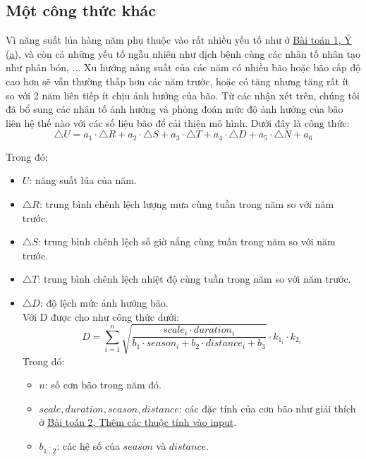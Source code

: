 \documentclass[12pt]{report}
\begin{document}
\subsection{Một công thức khác}
\begin{flushleft}
	Vì năng suất lúa hàng năm phụ thuộc vào rất nhiều yếu tố như ở \textcolor{blue}{\hyperlink{section.1.1}{Bài toán 1, Ý (a)}}, và còn cả những yếu tố ngẫu nhiên như dịch bệnh cùng các nhân tố nhân tạo như phân bón, ... Xu hướng năng suất của các năm có nhiều bão hoặc bão cấp độ cao hơn sẽ vẫn thường thấp hơn các năm trước, hoặc có tăng nhưng tăng rất ít so với 2 năm liên tiếp ít chịu ảnh hưởng của bão. Từ các nhận xét trên, chúng tôi đã bổ sung các nhân tố ảnh hưởng và phỏng đoán mức độ ảnh hưởng của bão liên hệ thế nào với các số liệu bão để cải thiện mô hình. Dưới đây là công thức:
	$$
		\triangle{U} = a_{1} \cdot \triangle{R} + a_{2} \cdot \triangle{S} + a_{3} \cdot \triangle{T} + a_{4} \cdot \triangle{D} + a_{5} \cdot \triangle{N} + a_{6}
	$$

	Trong đó:
	\begin{itemize}
		\item $U$: năng suất lúa của năm.

		\item $\triangle{R}$: trung bình chênh lệch lượng mưa cùng tuần trong năm so với năm trước.

		\item $\triangle{S}$: trung bình chênh lệch số giờ nắng cùng tuần trong năm so với năm trước.

		\item $\triangle{T}$: trung bình chênh lệch nhiệt độ cùng tuần trong năm so với năm trước.

		\item $\triangle{D}$: độ lệch mức ảnh hưởng bão.
		\\
		Với D được cho như công thức dưới:
		$$
			D = \sum\limits_{i = {1}}^{n} \sqrt{\frac{scale_{i} \cdot duration_{i}}{b_{1} \cdot season_{i} + b_{2} \cdot distance_{i} + b_{3}}} \cdot k_{{1}_{i}} \cdot k_{{2}_{i}}
		$$
		Trong đó:
		\begin{itemize}
			\item $n$: số cơn bão trong năm đó.

			\item $scale, duration, season, distance$: các đặc tính của cơn bão như giải thích ở \textcolor{blue}{\hyperlink{subsection.2.3.2}{Bài toán 2, Thêm các thuộc tính vào input}}.

			\item $b^{}_{\overline{1 \dots 2}}$: các hệ số của $season$ và $distance$.


\end{itemize}
\end{itemize}
\end{flushleft}
\end{document}
